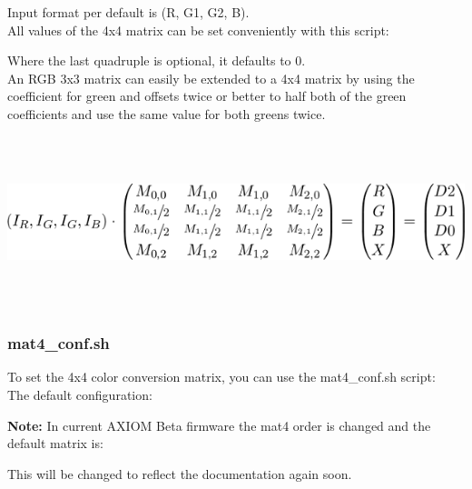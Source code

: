 {Input format per default is (R, G1, G2, B).\\

All values of the 4x4 matrix can be set conveniently with this script:\\

    
Where the last quadruple is optional, it defaults to 0.\\

An RGB 3x3 matrix can easily be extended to a 4x4 matrix by using the coefficient for green and offsets twice or better to half both of the green coefficients and use the same value for both greens twice. \\    
    
\begin{center}
\includegraphics[height=5cm]{images/Eqn5}
\end{center}
    
    
    
    
    
   

\subsubsection{mat4\_conf.sh}

To set the 4x4 color conversion matrix, you can use the mat4\_conf.sh script:\\

The default configuration: 


\textbf{Note:} In current AXIOM Beta firmware the mat4 order is changed and the default matrix is: 


This will be changed to reflect the documentation again soon.\\

}
